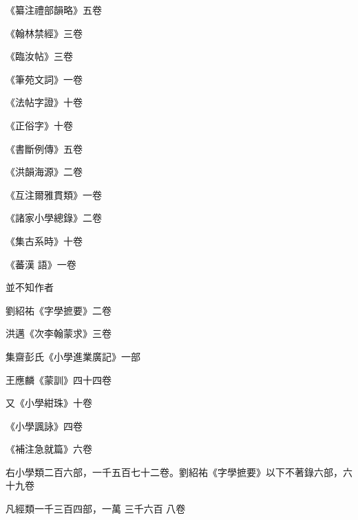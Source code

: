 \begin{pinyinscope}
 《纂注禮部韻略》五卷



 《翰林禁經》三卷



 《臨汝帖》三卷



 《筆苑文詞》一卷



 《法帖字證》十卷



 《正俗字》十卷



 《書斷例傳》五卷



 《洪韻海源》二卷



 《互注爾雅貫類》一卷



 《諸家小學總錄》二卷



 《集古系時》十卷



 《蕃漢
 語》一卷



 並不知作者



 劉紹祐《字學摭要》二卷



 洪邁《次李翰蒙求》三卷



 集齋彭氏《小學進業廣記》一部



 王應麟《蒙訓》四十四卷



 又《小學紺珠》十卷



 《小學諷詠》四卷



 《補注急就篇》六卷



 右小學類二百六部，一千五百七十二卷。劉紹祐《字學摭要》以下不著錄六部，六十九卷



 凡經類一千三百四部，一萬
 三千六百
 八卷



\end{pinyinscope}